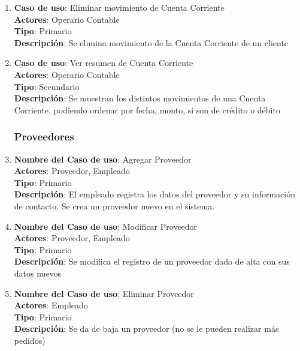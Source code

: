 \documentclass[12pt]{extarticle}
\begin{document}
\begin{spacing}{1.2}
\begin{enumerate}
            \item   \textbf{Caso de uso}: Eliminar movimiento de Cuenta Corriente\\
                    \textbf{Actores}: Operario Contable\\
                    \textbf{Tipo}: Primario\\
                    \textbf{Descripción}: Se elimina movimiento de la Cuenta Corriente de un cliente

            \item   \textbf{Caso de uso}: Ver resumen de Cuenta Corriente\\
                    \textbf{Actores}: Operario Contable\\
                    \textbf{Tipo}: Secundario\\
                    \textbf{Descripción}: Se muestran los distintos movimientos de una Cuenta Corriente, podiendo ordenar por fecha, monto, si son de crédito o débito



            \subsubsection{Proveedores}



            \item 	\textbf{Nombre del Caso de uso}: Agregar Proveedor\\
                    \textbf{Actores}: Proveedor, Empleado\\
                    \textbf{Tipo}: Primario\\
                    \textbf{Descripción}: El empleado registra los datos del proveedor y su información de contacto. Se crea un proveedor nuevo en el sistema.
            
            \item 	\textbf{Nombre del Caso de uso}: Modificar Proveedor\\
                    \textbf{Actores}: Proveedor, Empleado\\
                    \textbf{Tipo}: Primario\\
                    \textbf{Descripción}: Se modifica el registro de un proveedor dado de alta con sus datos nuevos
            
            \item 	\textbf{Nombre del Caso de uso}: Eliminar Proveedor\\
                    \textbf{Actores}: Empleado\\
                    \textbf{Tipo}: Primario\\
                    \textbf{Descripción}: Se da de baja un proveedor (no se le pueden realizar más pedidos)
            

\end{enumerate}
\end{spacing}
\end{document}

